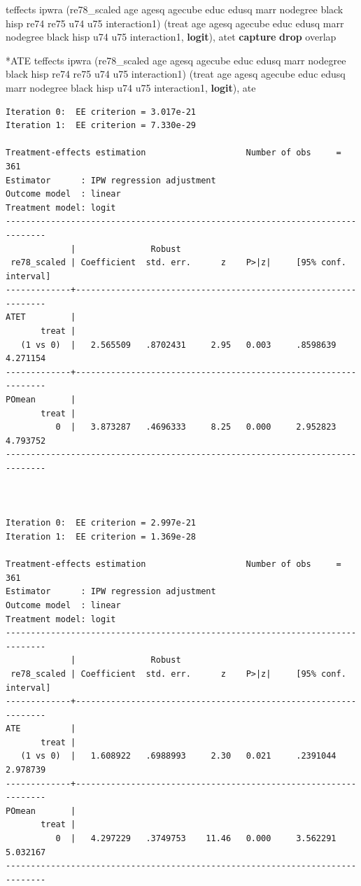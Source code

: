 \documentclass[
]{book}
\newenvironment{Shaded}{\begin{snugshade}}{\end{snugshade}}
\newcommand{\BaseNTok}[1]{\textcolor[rgb]{0.00,0.00,0.81}{#1}}
\newcommand{\KeywordTok}[1]{\textcolor[rgb]{0.13,0.29,0.53}{\textbf{#1}}}
\newcommand{\NormalTok}[1]{#1}
\begin{document}
\begin{Shaded}
\begin{Highlighting}[]
\NormalTok{teffects ipwra (re78\_scaled age agesq agecube educ edusq marr nodegree }\BaseNTok{black}\NormalTok{ hisp re74 re75 u74 u75 interaction1) (treat age agesq agecube educ edusq marr nodegree }\BaseNTok{black}\NormalTok{ hisp u74 u75 interaction1, }\KeywordTok{logit}\NormalTok{), atet}
\KeywordTok{capture} \KeywordTok{drop}\NormalTok{ overlap}

\NormalTok{*ATE}
\NormalTok{teffects ipwra (re78\_scaled age agesq agecube educ edusq marr nodegree }\BaseNTok{black}\NormalTok{ hisp re74 re75 u74 u75 interaction1) (treat age agesq agecube educ edusq marr nodegree }\BaseNTok{black}\NormalTok{ hisp u74 u75 interaction1, }\KeywordTok{logit}\NormalTok{), ate}
\end{Highlighting}
\end{Shaded}

\begin{verbatim}
Iteration 0:  EE criterion = 3.017e-21  
Iteration 1:  EE criterion = 7.330e-29  

Treatment-effects estimation                    Number of obs     =        361
Estimator      : IPW regression adjustment
Outcome model  : linear
Treatment model: logit
------------------------------------------------------------------------------
             |               Robust
 re78_scaled | Coefficient  std. err.      z    P>|z|     [95% conf. interval]
-------------+----------------------------------------------------------------
ATET         |
       treat |
   (1 vs 0)  |   2.565509   .8702431     2.95   0.003     .8598639    4.271154
-------------+----------------------------------------------------------------
POmean       |
       treat |
          0  |   3.873287   .4696333     8.25   0.000     2.952823    4.793752
------------------------------------------------------------------------------



Iteration 0:  EE criterion = 2.997e-21  
Iteration 1:  EE criterion = 1.369e-28  

Treatment-effects estimation                    Number of obs     =        361
Estimator      : IPW regression adjustment
Outcome model  : linear
Treatment model: logit
------------------------------------------------------------------------------
             |               Robust
 re78_scaled | Coefficient  std. err.      z    P>|z|     [95% conf. interval]
-------------+----------------------------------------------------------------
ATE          |
       treat |
   (1 vs 0)  |   1.608922   .6988993     2.30   0.021     .2391044    2.978739
-------------+----------------------------------------------------------------
POmean       |
       treat |
          0  |   4.297229   .3749753    11.46   0.000     3.562291    5.032167
------------------------------------------------------------------------------
\end{verbatim}
\end{document}
